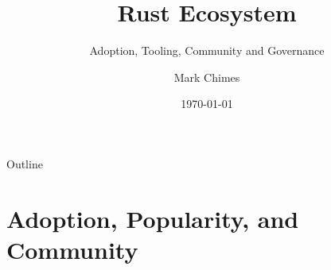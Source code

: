\documentclass{beamer}
\title{Rust Ecosystem}
\subtitle{Adoption, Tooling, Community and Governance}
\author{Mark Chimes}
\date{\today}
\begin{document}
\begin{frame}
    \titlepage
\end{frame}

\begin{frame}{Outline}
\tableofcontents
\end{frame}

\section{Adoption, Popularity, and Community}

\end{document}

